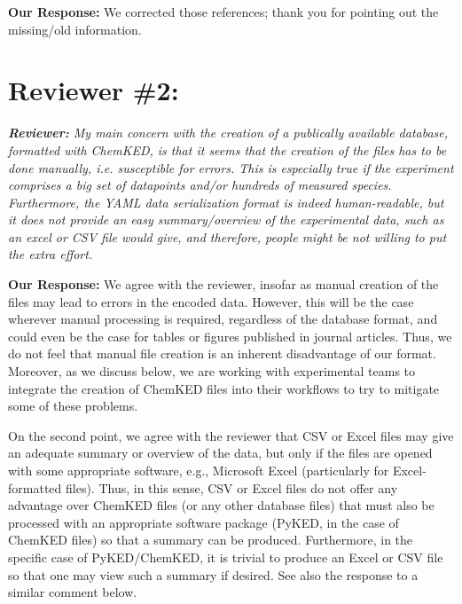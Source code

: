 \documentclass[a4paper,10pt]{elsarticle}
\newenvironment{reviewer}{\vspace{0.5\baselineskip}\begingroup\itshape\textbf{Reviewer:}}{\endgroup\vspace{0.5\baselineskip}}
\newenvironment{response}{\vspace{0.5\baselineskip}\textbf{Our Response:}}{\vspace{0.5\baselineskip}}
\begin{document}
\begin{response}
    We corrected those references; thank you for pointing out the missing\slash old information.
\end{response}

\section*{Reviewer \#2:}

\begin{reviewer}
    My main concern with the creation of a publically available database, formatted with ChemKED, is
    that it seems that the creation of the files has to be done manually, i.e. susceptible for
    errors. This is especially true if the experiment comprises a big set of datapoints and/or
    hundreds of measured species. Furthermore, the YAML data serialization format is indeed
    human-readable, but it does not provide an easy summary/overview of the experimental data, such
    as an excel or CSV file would give, and therefore, people might be not willing to put the extra
    effort.
\end{reviewer}

\begin{response}
    We agree with the reviewer, insofar as manual creation of the files may lead to errors in the
    encoded data. However, this will be the case wherever manual processing is required, regardless
    of the database format, and could even be the case for tables or figures published in journal
    articles. Thus, we do not feel that manual file creation is an inherent disadvantage of our
    format. Moreover, as we discuss below, we are working with experimental teams to integrate the
    creation of ChemKED files into their workflows to try to mitigate some of these problems.

    On the second point, we agree with the reviewer that CSV or Excel files may give an adequate
    summary or overview of the data, but only if the files are opened with some appropriate
    software, e.g., Microsoft Excel (particularly for Excel-formatted files). Thus, in this sense,
    CSV or Excel files do not offer any advantage over ChemKED files (or any other database files)
    that must also be processed with an appropriate software package (PyKED, in the case of ChemKED
    files) so that a summary can be produced. Furthermore, in the specific case of PyKED/ChemKED,
    it is trivial to produce an Excel or CSV file so that one may view such a summary if desired.
    See also the response to a similar comment below.
\end{response}
\end{document}
